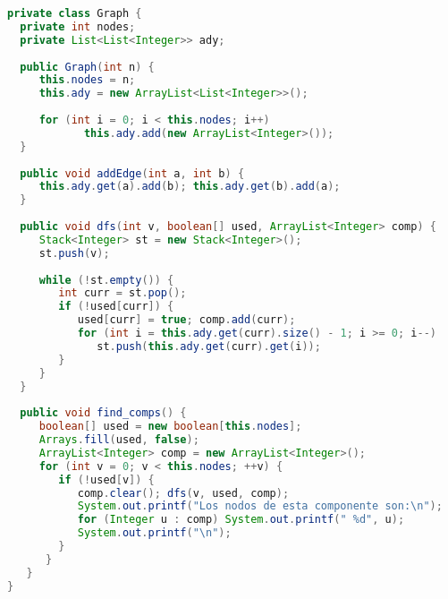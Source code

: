 \begin{lstlisting}[language=Java]
private class Graph {
  private int nodes;
  private List<List<Integer>> ady;
	
  public Graph(int n) {
     this.nodes = n;
     this.ady = new ArrayList<List<Integer>>();
		
     for (int i = 0; i < this.nodes; i++)
			this.ady.add(new ArrayList<Integer>());
  }
	
  public void addEdge(int a, int b) {
     this.ady.get(a).add(b); this.ady.get(b).add(a);
  }
	
  public void dfs(int v, boolean[] used, ArrayList<Integer> comp) {
     Stack<Integer> st = new Stack<Integer>();
     st.push(v);
		
     while (!st.empty()) {
        int curr = st.pop();
        if (!used[curr]) {
           used[curr] = true; comp.add(curr);
           for (int i = this.ady.get(curr).size() - 1; i >= 0; i--) 
              st.push(this.ady.get(curr).get(i));
        }
	 }
  }
	
  public void find_comps() {
     boolean[] used = new boolean[this.nodes];
     Arrays.fill(used, false);
     ArrayList<Integer> comp = new ArrayList<Integer>();
     for (int v = 0; v < this.nodes; ++v) {
        if (!used[v]) {
           comp.clear(); dfs(v, used, comp);
           System.out.printf("Los nodos de esta componente son:\n");
           for (Integer u : comp) System.out.printf(" %d", u);
           System.out.printf("\n");
        }
      }
   }
}
\end{lstlisting}	